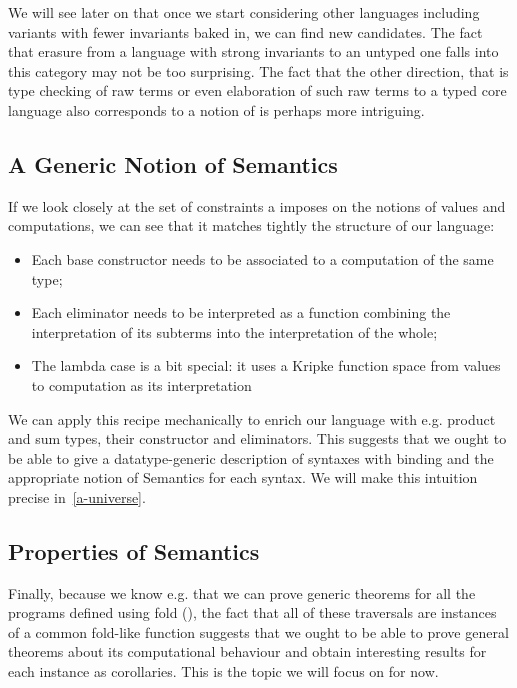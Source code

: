 We will see later on that once we start considering other languages including
variants with fewer invariants baked in, we can find new candidates. The fact
that erasure from a language with strong invariants to an untyped one falls
into this category may not be too surprising. The fact that the other direction,
that is type checking of raw terms or even elaboration of such raw terms to a
typed core language also corresponds to a notion of  is perhaps
more intriguing.

\subsection{A Generic Notion of Semantics}

If we look closely at the set of constraints a  imposes on the
notions of values and computations, we can see that it matches tightly the
structure of our language:

\begin{itemize}
  \item Each base constructor needs to be associated to a computation of the
    same type;
  \item Each eliminator needs to be interpreted as a function combining the
    interpretation of its subterms into the interpretation of the whole;
  \item The lambda case is a bit special: it uses a Kripke function space
    from values to computation as its interpretation
\end{itemize}

We can apply this recipe mechanically to enrich our language with e.g.
product and sum types, their constructor and eliminators. This suggests
that we ought to be able to give a datatype-generic description of
syntaxes with binding and the appropriate notion of Semantics for each
syntax. We will make this intuition precise in~\cref{a-universe}.

\subsection{Properties of Semantics}

Finally, because we know e.g. that we can prove generic theorems for all the
programs defined using fold (\cite{DBLP:journals/scp/Malcolm90}), the fact
that all of these traversals are instances of a common fold-like function
suggests that we ought to be able to prove general theorems about its
computational behaviour and obtain interesting results for each instance
as corollaries. This is the topic we will focus on for now.
